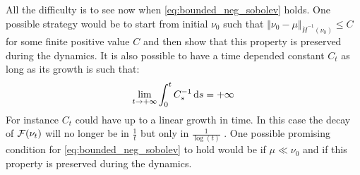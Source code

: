 All the difficulty is to see now when \cref{eq:bounded_neg_sobolev} holds. One possible strategy would be to start from initial $\nu_0$ such that $\Vert \nu_0  - \mu \Vert_{\dot{H}^{-1}(\nu_0)} \leq C $  for some finite positive value $C$ and then show that this property is preserved during the dynamics. It is also possible to have a time depended constant $C_t$ as long as its growth is such that:
\begin{align}
	\lim_{t\rightarrow +\infty} \int_0^t C_s^{-1}\mathop{}\!\mathrm{d} s = +\infty
\end{align}
For instance $C_t$ could have up to a linear growth in time. In this case the decay of ${{\mathcal F}}(\nu_t)$ will no longer be in $\frac{1}{t}$ but only in $\frac{1}{\log(t)}$ .
One possible promising condition for \cref{eq:bounded_neg_sobolev} to hold would be if $\mu \ll \nu_0$ and if this property is preserved during the dynamics.


 








